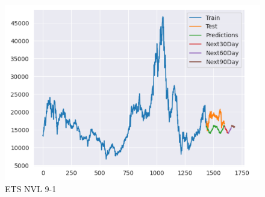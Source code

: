 \documentclass[conference]{IEEEtran}
\begin{document}
\begin{figure}[htbp]
\begin{minipage}{0.23\textwidth}
    \includegraphics[width=1\textwidth]{experiment/ets/TEAM4_ETS_DXG_9_1.png}
    \caption{ETS NVL 9-1}
    \label{fig:nvl_histogram}
    \end{minipage}
\end{figure}
\end{document}

